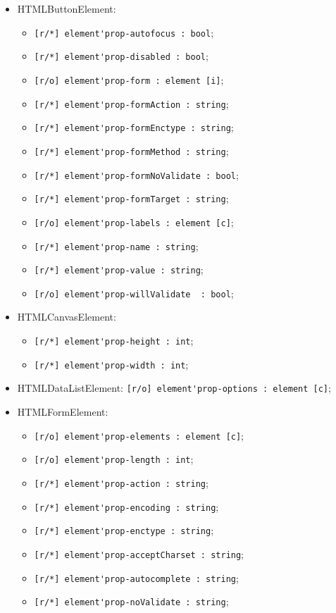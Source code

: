 \documentclass[a4paper, 14pt]{extarticle}
\newenvironment{icItems}
	{ \begin{itemize} [noitemsep,nolistsep] }
	{ \end{itemize} }
\begin{document}
\begin{icItems}
	\item HTMLButtonElement:
	\begin{icItems}
		\item \lstinline|[r/*] element'prop-autofocus : bool|;
		\item \lstinline|[r/*] element'prop-disabled : bool|;
		\item \lstinline|[r/o] element'prop-form : element [i]|;
		\item \lstinline|[r/*] element'prop-formAction : string|;
		\item \lstinline|[r/*] element'prop-formEnctype : string|;
		\item \lstinline|[r/*] element'prop-formMethod : string|;
		\item \lstinline|[r/*] element'prop-formNoValidate : bool|;
		\item \lstinline|[r/*] element'prop-formTarget : string|;
		\item \lstinline|[r/o] element'prop-labels : element [c]|;
		\item \lstinline|[r/*] element'prop-name : string|;
		\item \lstinline|[r/*] element'prop-value : string|;
		\item \lstinline|[r/o] element'prop-willValidate  : bool|;
	\end{icItems}
	
	\item HTMLCanvasElement:
	\begin{icItems}
		\item \lstinline|[r/*] element'prop-height : int|;
		\item \lstinline|[r/*] element'prop-width : int|;
	\end{icItems}
	
	\item HTMLDataListElement: \lstinline|[r/o] element'prop-options : element [c]|;
	
	\item HTMLFormElement:
	\begin{icItems}
		\item \lstinline|[r/o] element'prop-elements : element [c]|;
		\item \lstinline|[r/o] element'prop-length : int|;
		\item \lstinline|[r/*] element'prop-action : string|;
		\item \lstinline|[r/*] element'prop-encoding : string|;
		\item \lstinline|[r/*] element'prop-enctype : string|;
		\item \lstinline|[r/*] element'prop-acceptCharset : string|;
		\item \lstinline|[r/*] element'prop-autocomplete : string|;
		\item \lstinline|[r/*] element'prop-noValidate : string|;
	\end{icItems}
	

\end{icItems}
\end{document}

